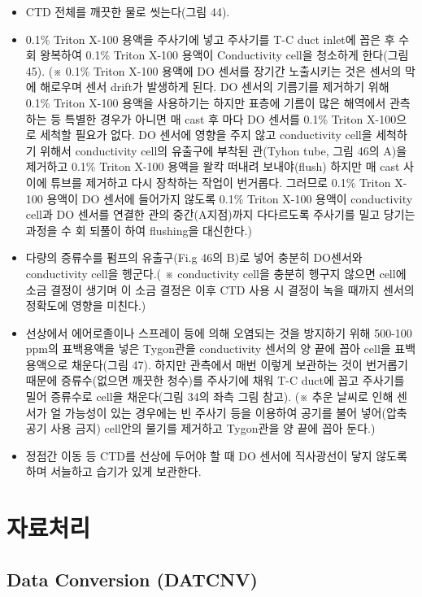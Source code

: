 \documentclass[
]{book}
\providecommand{\tightlist}{%
  \setlength{\itemsep}{0pt}\setlength{\parskip}{0pt}}
\begin{document}
\begin{itemize}
\tightlist
\item
  CTD 전체를 깨끗한 물로 씻는다(그림 44).
\item
  0.1\% Triton X-100 용액을 주사기에 넣고 주사기를 T-C duct inlet에 꼽은 후 수 회 왕복하여 0.1\% Triton X-100 용액이 Conductivity cell을 청소하게 한다(그림 45). (※ 0.1\% Triton X-100 용액에 DO 센서를 장기간 노출시키는 것은 센서의 막에 해로우며 센서 drift가 발생하게 된다. DO 센서의 기름기를 제거하기 위해 0.1\% Triton X-100 용액을 사용하기는 하지만 표층에 기름이 많은 해역에서 관측하는 등 특별한 경우가 아니면 매 cast 후 마다 DO 센서를 0.1\% Triton X-100으로 세척할 필요가 없다. DO 센서에 영향을 주지 않고 conductivity cell을 세척하기 위해서 conductivity cell의 유출구에 부착된 관(Tyhon tube, 그림 46의 A)을 제거하고 0.1\% Triton X-100 용액을 왈칵 떠내려 보내야(flush) 하지만 매 cast 사이에 튜브를 제거하고 다시 장착하는 작업이 번거롭다. 그러므로 0.1\% Triton X-100 용액이 DO 센서에 들어가지 않도록 0.1\% Triton X-100 용액이 conductivity cell과 DO 센서를 연결한 관의 중간(A지점)까지 다다르도록 주사기를 밀고 당기는 과정을 수 회 되풀이 하여 flushing을 대신한다.)
\item
  다량의 증류수를 펌프의 유출구(Fi.g 46의 B)로 넣어 충분히 DO센서와 conductivity cell을 헹군다.( ※ conductivity cell을 충분히 헹구지 않으면 cell에 소금 결정이 생기며 이 소금 결정은 이후 CTD 사용 시 결정이 녹을 때까지 센서의 정확도에 영향을 미친다.)
\item
  선상에서 에어로졸이나 스프레이 등에 의해 오염되는 것을 방지하기 위해 500-100 ppm의 표백용액을 넣은 Tygon관을 conductivity 센서의 양 끝에 꼽아 cell을 표백용액으로 채운다(그림 47). 하지만 관측에서 매번 이렇게 보관하는 것이 번거롭기 때문에 증류수(없으면 깨끗한 청수)를 주사기에 채워 T-C duct에 꼽고 주사기를 밀어 증류수로 cell을 채운다(그림 34의 좌측 그림 참고). (※ 추운 날씨로 인해 센서가 얼 가능성이 있는 경우에는 빈 주사기 등을 이용하여 공기를 불어 넣어(압축공기 사용 금지) cell안의 물기를 제거하고 Tygon관을 양 끝에 꼽아 둔다.)
\item
  정점간 이동 등 CTD를 선상에 두어야 할 때 DO 센서에 직사광선이 닿지 않도록 하며 서늘하고 습기가 있게 보관한다.
\end{itemize}

\hypertarget{uxc790uxb8ccuxcc98uxb9ac}{%
\section{자료처리}\label{uxc790uxb8ccuxcc98uxb9ac}}

\hypertarget{data-conversion-datcnv}{%
\subsection{Data Conversion (DATCNV)}\label{data-conversion-datcnv}}
\end{document}
